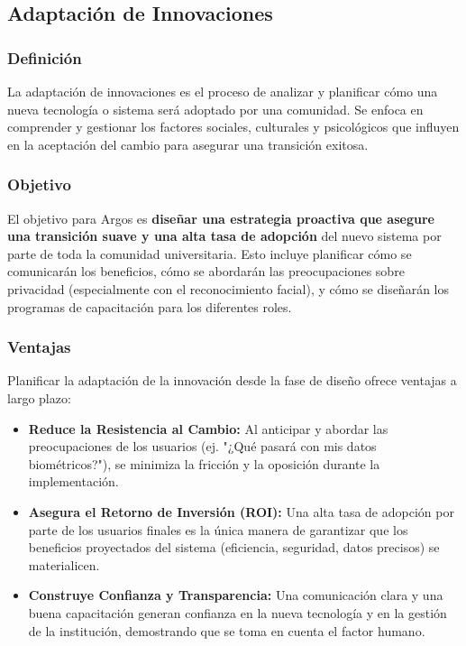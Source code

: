 \clearpage
\subsection{Adaptación de Innovaciones}

\subsubsection{Definición}
La adaptación de innovaciones es el proceso de analizar y planificar cómo una nueva tecnología o sistema será adoptado por una comunidad. Se enfoca en comprender y gestionar los factores sociales, culturales y psicológicos que influyen en la aceptación del cambio para asegurar una transición exitosa.

\subsubsection{Objetivo}
El objetivo para Argos es \textbf{diseñar una estrategia proactiva que asegure una transición suave y una alta tasa de adopción} del nuevo sistema por parte de toda la comunidad universitaria. Esto incluye planificar cómo se comunicarán los beneficios, cómo se abordarán las preocupaciones sobre privacidad (especialmente con el reconocimiento facial), y cómo se diseñarán los programas de capacitación para los diferentes roles.

\subsubsection{Ventajas}
Planificar la adaptación de la innovación desde la fase de diseño ofrece ventajas a largo plazo:
\begin{itemize}
	\item \textbf{Reduce la Resistencia al Cambio:} Al anticipar y abordar las preocupaciones de los usuarios (ej. "¿Qué pasará con mis datos biométricos?"), se minimiza la fricción y la oposición durante la implementación.
	\item \textbf{Asegura el Retorno de Inversión (ROI):} Una alta tasa de adopción por parte de los usuarios finales es la única manera de garantizar que los beneficios proyectados del sistema (eficiencia, seguridad, datos precisos) se materialicen.
	\item \textbf{Construye Confianza y Transparencia:} Una comunicación clara y una buena capacitación generan confianza en la nueva tecnología y en la gestión de la institución, demostrando que se toma en cuenta el factor humano.
\end{itemize}

